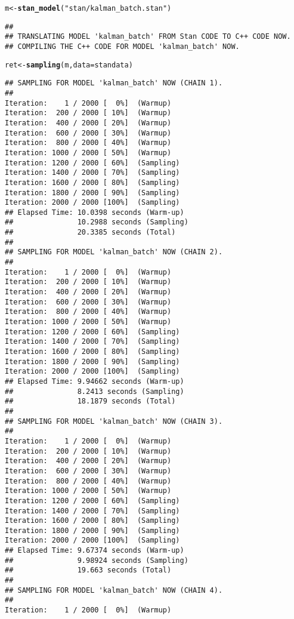 \documentclass{article}\usepackage[]{graphicx}\usepackage[]{color}
\makeatletter
\newcommand{\hlstr}[1]{\textcolor[rgb]{0.192,0.494,0.8}{#1}}%
\newcommand{\hlstd}[1]{\textcolor[rgb]{0.345,0.345,0.345}{#1}}%
\newcommand{\hlkwb}[1]{\textcolor[rgb]{0.69,0.353,0.396}{#1}}%
\newcommand{\hlkwc}[1]{\textcolor[rgb]{0.333,0.667,0.333}{#1}}%
\newcommand{\hlkwd}[1]{\textcolor[rgb]{0.737,0.353,0.396}{\textbf{#1}}}%
\newenvironment{kframe}{%
 \def\at@end@of@kframe{}%
 \ifinner\ifhmode%
  \def\at@end@of@kframe{\end{minipage}}%
  \begin{minipage}{\columnwidth}%
 \fi\fi%
 \def\FrameCommand##1{\hskip\@totalleftmargin \hskip-\fboxsep
 \colorbox{shadecolor}{##1}\hskip-\fboxsep
     \hskip-\linewidth \hskip-\@totalleftmargin \hskip\columnwidth}%
 \MakeFramed {\advance\hsize-\width
   \@totalleftmargin\z@ \linewidth\hsize
   \@setminipage}}%
 {\par\unskip\endMakeFramed%
 \at@end@of@kframe}
\newenvironment{knitrout}{}{} %
\makeatother
\begin{document}
\begin{knitrout}
\begin{kframe}
\begin{alltt}
\hlstd{m} \hlkwb{<-} \hlkwd{stan_model}\hlstd{(}\hlstr{"stan/kalman_batch.stan"}\hlstd{)}
\end{alltt}
\begin{verbatim}
## 
## TRANSLATING MODEL 'kalman_batch' FROM Stan CODE TO C++ CODE NOW.
## COMPILING THE C++ CODE FOR MODEL 'kalman_batch' NOW.
\end{verbatim}
\begin{alltt}
\hlstd{ret} \hlkwb{<-} \hlkwd{sampling}\hlstd{(m,} \hlkwc{data} \hlstd{= standata)}
\end{alltt}
\begin{verbatim}
## SAMPLING FOR MODEL 'kalman_batch' NOW (CHAIN 1).
## 
Iteration:    1 / 2000 [  0%]  (Warmup)
Iteration:  200 / 2000 [ 10%]  (Warmup)
Iteration:  400 / 2000 [ 20%]  (Warmup)
Iteration:  600 / 2000 [ 30%]  (Warmup)
Iteration:  800 / 2000 [ 40%]  (Warmup)
Iteration: 1000 / 2000 [ 50%]  (Warmup)
Iteration: 1200 / 2000 [ 60%]  (Sampling)
Iteration: 1400 / 2000 [ 70%]  (Sampling)
Iteration: 1600 / 2000 [ 80%]  (Sampling)
Iteration: 1800 / 2000 [ 90%]  (Sampling)
Iteration: 2000 / 2000 [100%]  (Sampling)
## Elapsed Time: 10.0398 seconds (Warm-up)
##               10.2988 seconds (Sampling)
##               20.3385 seconds (Total)
## 
## SAMPLING FOR MODEL 'kalman_batch' NOW (CHAIN 2).
## 
Iteration:    1 / 2000 [  0%]  (Warmup)
Iteration:  200 / 2000 [ 10%]  (Warmup)
Iteration:  400 / 2000 [ 20%]  (Warmup)
Iteration:  600 / 2000 [ 30%]  (Warmup)
Iteration:  800 / 2000 [ 40%]  (Warmup)
Iteration: 1000 / 2000 [ 50%]  (Warmup)
Iteration: 1200 / 2000 [ 60%]  (Sampling)
Iteration: 1400 / 2000 [ 70%]  (Sampling)
Iteration: 1600 / 2000 [ 80%]  (Sampling)
Iteration: 1800 / 2000 [ 90%]  (Sampling)
Iteration: 2000 / 2000 [100%]  (Sampling)
## Elapsed Time: 9.94662 seconds (Warm-up)
##               8.2413 seconds (Sampling)
##               18.1879 seconds (Total)
## 
## SAMPLING FOR MODEL 'kalman_batch' NOW (CHAIN 3).
## 
Iteration:    1 / 2000 [  0%]  (Warmup)
Iteration:  200 / 2000 [ 10%]  (Warmup)
Iteration:  400 / 2000 [ 20%]  (Warmup)
Iteration:  600 / 2000 [ 30%]  (Warmup)
Iteration:  800 / 2000 [ 40%]  (Warmup)
Iteration: 1000 / 2000 [ 50%]  (Warmup)
Iteration: 1200 / 2000 [ 60%]  (Sampling)
Iteration: 1400 / 2000 [ 70%]  (Sampling)
Iteration: 1600 / 2000 [ 80%]  (Sampling)
Iteration: 1800 / 2000 [ 90%]  (Sampling)
Iteration: 2000 / 2000 [100%]  (Sampling)
## Elapsed Time: 9.67374 seconds (Warm-up)
##               9.98924 seconds (Sampling)
##               19.663 seconds (Total)
## 
## SAMPLING FOR MODEL 'kalman_batch' NOW (CHAIN 4).
## 
Iteration:    1 / 2000 [  0%]  (Warmup)

\end{verbatim}
\end{kframe}
\end{knitrout}
\end{document}
